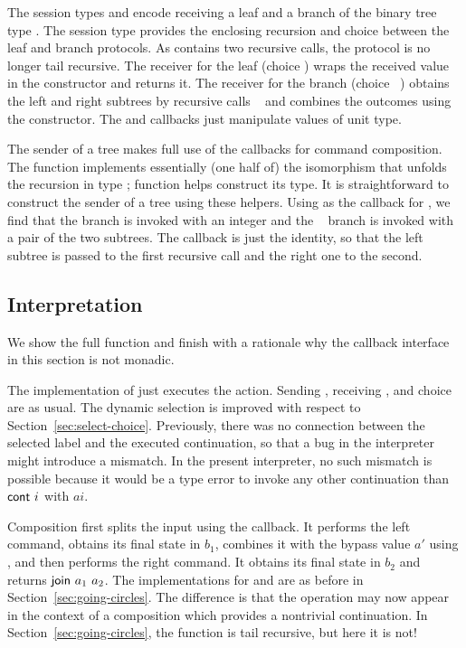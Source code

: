 \documentclass[acmsmall,screen,anonymous,review]{acmart}
\begin{document}
The session types {\Aleafp} and {\Abranchp} encode receiving a leaf and
a branch of the binary tree type {\AIntTree}. The session type
{\Atreep} provides the enclosing recursion and choice between the leaf
and branch protocols. As {\Abranchp} contains two recursive calls,
the protocol {\Atreep} is no longer tail recursive.
\cstRecvTree
The receiver for the leaf (choice {\Azero}) wraps the received value in the {\ACLeaf}
constructor and returns it.
The receiver for the branch (choice {\Asuc~\Azero}) obtains the left and right subtrees by
recursive calls {\ACONTINUE~\Azero} and combines the outcomes using
the {\ACBranch} constructor. The {\Asplit} and {\Across} callbacks
just manipulate values of unit type.

The sender of a tree makes full use of the callbacks for command
composition. 
\cstSendTree
The function {\AsplitTree} implements essentially (one half of) the
isomorphism that unfolds the recursion in type {\AIntTree};
function {\AIntTreeF} helps construct its type. It is straightforward
to construct the sender of a tree using these helpers. Using
{\AsplitTree} as the callback for {\ACSELECT}, we find that the
{\Azero} branch is invoked with an integer and the {\Asuc~\Azero}
branch is invoked with a pair of the two subtrees. The {\Asplit}
callback is just the identity, so that the left subtree is passed to
the first recursive call and the right one to the second.

\subsection{Interpretation}
\label{sec:interpretation}


We show the full {\Aexecutor} function and finish with a rationale why
the callback interface in this section is not monadic.
\cstExec

The implementation of {\ACSKIP} just executes the action.
Sending  {\ACSEND}, receiving  {\ACRECV}, and choice {\ACCHOICE} are as usual.
The dynamic selection is improved with respect to
Section~\ref{sec:select-choice}. Previously, there was no connection
between the selected label and the executed continuation, so that a
bug in the interpreter might introduce a mismatch. In the present
interpreter, no such mismatch is possible because it would be a type
error to invoke any other continuation than $\Acont~i$ with $ai$.

Composition first splits the input using the {\Asplit} callback. It performs the left command, obtains its final state in
$b_1$, combines it with the bypass value $a'$ using {\Across}, and
then performs the right command. It obtains its final state in
$b_2$ and returns $\Ajoin~a_1~a_2$.
The implementations for {\AMU} and {\ACONTINUE} are as before in
Section~\ref{sec:going-circles}. The difference is that the
{\ACONTINUE} operation may now appear in the context of a composition
which provides a nontrivial continuation. In
Section~\ref{sec:going-circles}, the function {\Aexecutor} is tail
recursive, but here it is not!
\end{document}
